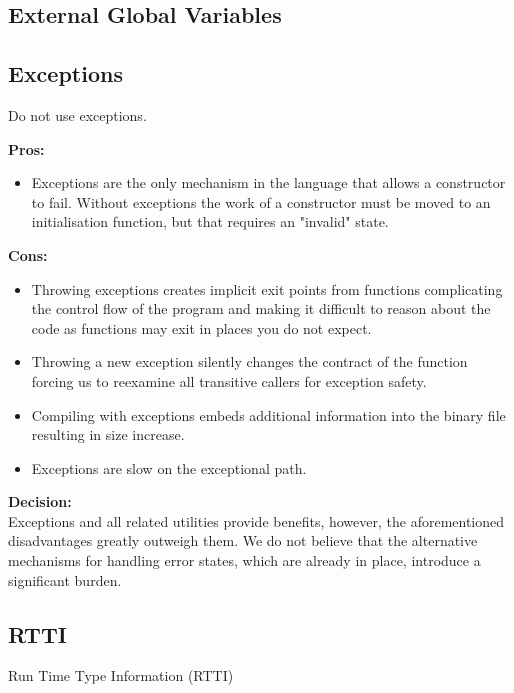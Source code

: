 \documentclass[12pt, a4paper]{article}
\newenvironment{itemlist}
{
\vspace{-0.5\topsep}
\begin{itemize}
  \setlength{\itemsep}{4pt}
  \setlength{\parskip}{0pt}
} {
\end{itemize}
\vspace{-0.5\topsep}
}
\begin{document}
\subsection{External Global Variables}

\subsection{Exceptions}
Do not use exceptions.

\noindent\textbf{Pros:}
\begin{itemlist}
  \item Exceptions are the only mechanism in the language that allows a
  constructor to fail. Without exceptions the work of a constructor must be
  moved to an initialisation function, but that requires an "invalid" state.
\end{itemlist}

\noindent\textbf{Cons:}
\begin{itemlist}
  \item Throwing exceptions creates implicit exit points from functions
  complicating the control flow of the program and making it difficult to reason
  about the code as functions may exit in places you do not expect.
  \item Throwing a new exception silently changes the contract of the function
  forcing us to reexamine all transitive callers for exception safety.
  \item Compiling with exceptions embeds additional information into the binary
  file resulting in size increase.
  \item Exceptions are slow on the exceptional path.
\end{itemlist}

\noindent\textbf{Decision:} \\
Exceptions and all related utilities provide benefits, however, the
aforementioned disadvantages greatly outweigh them. We do not believe that the
alternative mechanisms for handling error states, which are already in place,
introduce a significant burden.

\subsection{RTTI}
Run Time Type Information (RTTI)
\end{document}
